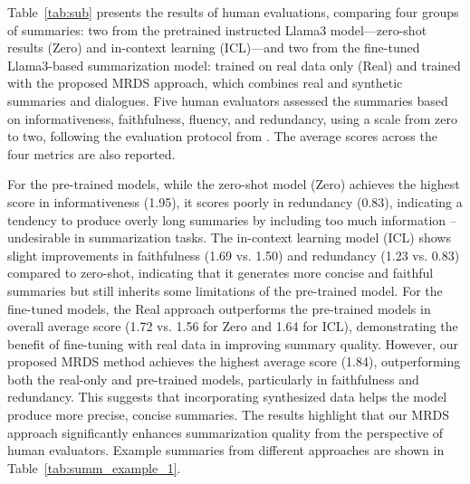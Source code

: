 Table~\ref{tab:sub} presents the results of human evaluations, comparing four groups of summaries: two from the pretrained instructed Llama3 model—zero-shot results (Zero) and in-context learning (ICL)—and two from the fine-tuned Llama3-based summarization model: trained on real data only (Real) and trained with the proposed MRDS approach, which combines real and synthetic summaries and dialogues. Five human evaluators assessed the summaries based on informativeness, faithfulness, fluency, and redundancy, using a scale from zero to two, following the evaluation protocol from \citep{xie-etal-2024-shot}. The average scores across the four metrics are also reported.

For the pre-trained models, while the zero-shot model (Zero) achieves the highest score in informativeness (1.95), it scores poorly in redundancy (0.83), indicating a tendency to produce overly long summaries by including too much information --undesirable in summarization tasks. 
The in-context learning model (ICL) shows slight improvements in faithfulness (1.69 vs. 1.50) and redundancy (1.23 vs. 0.83) compared to zero-shot, indicating that it generates more concise and faithful summaries but still inherits some limitations of the pre-trained model.
For the fine-tuned models, the Real approach outperforms the pre-trained models in overall average score (1.72 vs. 1.56 for Zero and 1.64 for ICL), demonstrating the benefit of fine-tuning with real data in improving summary quality.
However, our proposed MRDS method achieves the highest average score (1.84), outperforming both the real-only and pre-trained models, particularly in faithfulness and redundancy. 
This suggests that incorporating synthesized data helps the model produce more precise, concise summaries. The results highlight that our MRDS approach significantly enhances summarization quality from the perspective of human evaluators. Example summaries from different approaches are shown in Table~\ref{tab:summ_example_1}.


